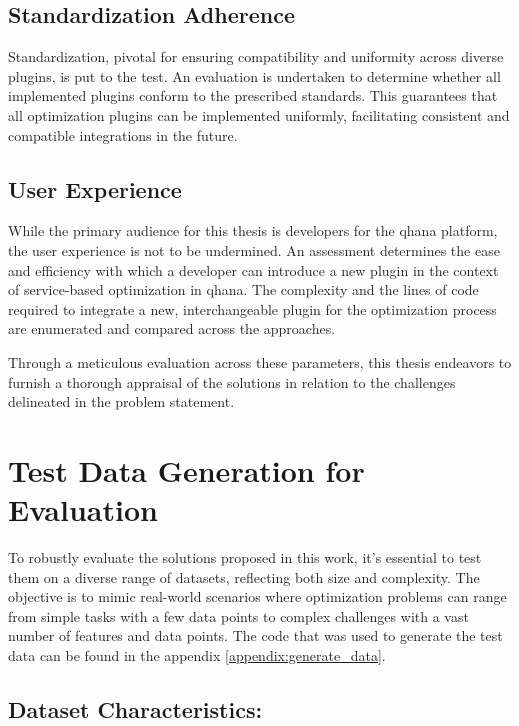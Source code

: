 \documentclass[
  a4paper,  %
  twoside,  %
  bibliography=totoc,
  headsepline,
  cleardoublepage=empty,
  parskip=half,
  draft=false
]{scrbook}
\begin{document}
\subsection{Standardization Adherence}
Standardization, pivotal for ensuring compatibility and uniformity across diverse plugins, is put to the test.
An evaluation is undertaken to determine whether all implemented plugins conform to the prescribed standards.
This guarantees that all optimization plugins can be implemented uniformly, facilitating consistent and compatible integrations in the future.

\subsection{User Experience}
While the primary audience for this thesis is developers for the \gls{qhana} platform, the user experience is not to be undermined.
An assessment determines the ease and efficiency with which a developer can introduce a new plugin in the context of service-based optimization in \gls{qhana}.
The complexity and the lines of code required to integrate a new, interchangeable plugin for the optimization process are enumerated and compared across the approaches.

Through a meticulous evaluation across these parameters, this thesis endeavors to furnish a thorough appraisal of the solutions in relation to the challenges delineated in the problem statement.\section{Test Data Generation for Evaluation}

To robustly evaluate the solutions proposed in this work, it's essential to test them on a diverse range of datasets, reflecting both size and complexity.
The objective is to mimic real-world scenarios where optimization problems can range from simple tasks with a few data points to complex challenges with a vast number of features and data points.
The code that was used to generate the test data can be found in the appendix \ref{appendix:generate_data}.

\subsection{Dataset Characteristics:}
\end{document}

